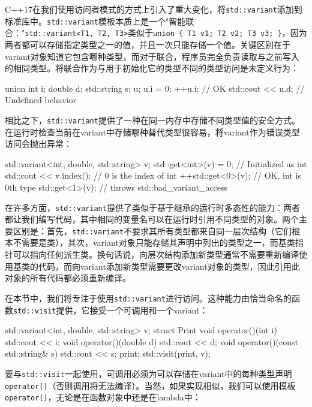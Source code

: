 \begin{code}
{C++17在我们使用访问者模式的方式上引入了重大变化，将\texttt{std::variant}添加到标准库中。\texttt{std::variant}模板本质上是一个"智能联合："\texttt{std::variant\textless{}T1,\ T2,\ T3\textgreater{}}类似于\texttt{union\ \{\ T1\ v1;\ T2\ v2;\ T3\ v3;\ \}}，因为两者都可以存储指定类型之一的值，并且一次只能存储一个值。关键区别在于variant对象知道它包含哪种类型，而对于联合，程序员完全负责读取与之前写入的相同类型。将联合作为与用于初始化它的类型不同的类型访问是未定义行为：

\begin{code}
union { int i; double d; std::string s; } u;
u.i = 0;
++u.i;               // OK
std::cout << u.d;     // Undefined behavior
\end{code}

相比之下，\texttt{std::variant}提供了一种在同一内存中存储不同类型值的安全方式。在运行时检查当前在variant中存储哪种替代类型很容易，将variant作为错误类型访问会抛出异常：

\begin{code}
std::variant<int, double, std::string> v;
std::get<int>(v) = 0;     // Initialized as int
std::cout << v.index();     // 0 is the index of int
++std::get<0>(v);     // OK, int is 0th type
std::get<1>(v);          // throws std::bad_variant_access
\end{code}

在许多方面，\texttt{std::variant}提供了类似于基于继承的运行时多态性的能力：两者都让我们编写代码，其中相同的变量名可以在运行时引用不同类型的对象。两个主要区别是：首先，\texttt{std::variant}不要求其所有类型都来自同一层次结构（它们根本不需要是类），其次，variant对象只能存储其声明中列出的类型之一，而基类指针可以指向任何派生类。换句话说，向层次结构添加新类型通常不需要重新编译使用基类的代码，而向variant添加新类型需要更改variant对象的类型，因此引用此对象的所有代码都必须重新编译。

在本节中，我们将专注于使用\texttt{std::variant}进行访问。这种能力由恰当命名的函数\texttt{std::visit}提供，它接受一个可调用和一个variant：

\begin{code}
std::variant<int, double, std::string> v;
struct Print {
  void operator()(int i) { std::cout << i; }
  void operator()(double d) { std::cout << d; }
  void operator()(const std::string& s) { std::cout << s; }
} print;
std::visit(print, v);
\end{code}

要与\texttt{std::visit}一起使用，可调用必须为可以存储在variant中的每种类型声明\texttt{operator()}（否则调用将无法编译）。当然，如果实现相似，我们可以使用模板\texttt{operator()}，无论是在函数对象中还是在lambda中：

}
\end{code}
